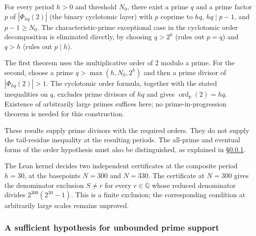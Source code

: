 \begin{thm}\label{thm:prime-satisfying-stated-cyclotomic-conditions}
For every period $h>0$ and threshold $N_0$, there exist a prime $q$ and a
prime factor $p$ of $|\Phi_{hq}(2)|$ (the binary cyclotomic layer) with $p$
coprime to $hq$, $hq\mid p-1$, and $p-1\ge N_0$. The characteristic-prime
exceptional case in the cyclotomic order decomposition is eliminated
directly, by choosing $q>2^h$ (rules out $p=q$) and $q>h$ (rules out
$p\mid h$).
\end{thm}

\begin{obs}
The first theorem uses the multiplicative order of $2$ modulo a prime.
For the second, choose a prime $q>\max(h,N_0,2^h)$ and then a prime
divisor of $|\Phi_{hq}(2)|>1$. The cyclotomic order formula, together
with the stated inequalities on $q$, excludes prime divisors of $hq$
and gives $\operatorname{ord}_p(2)=hq$. Existence of arbitrarily large
primes suffices here; no prime-in-progression theorem is needed for this
construction.

These results supply prime divisors with the required orders. They do
not supply the tail-residue inequality at the resulting periods. The
all-prime and eventual forms of the order hypothesis must also be
distinguished, as explained in \S\ref{prime-ray-curvature}.
\end{obs}

\begin{obs}
The Lean kernel decides two independent certificates at the composite
period $h=30$, at the basepoints $N=300$ and $N=330$. The certificate at
$N=300$ gives the denominator exclusion $S\ne r$ for every $r\in\mathbb{Q}$
whose reduced denominator divides $2^{300}(2^{30}-1)$.
\quad {}
This is a finite exclusion; the corresponding condition at arbitrarily
large scales remains unproved.
\end{obs}

\subsubsection{A sufficient hypothesis for unbounded prime support}
\label{prime-ray-curvature}

